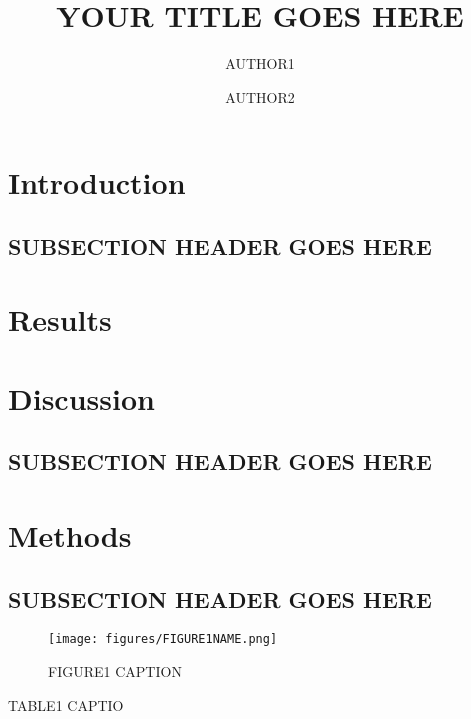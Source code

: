 \documentclass[fleqn,10pt]{wlscirep}
\title{YOUR TITLE GOES HERE}
\author[1,*]{AUTHOR1}
\author[1,*]{AUTHOR2}
\affil[*]{EMAIL}
\begin{document}
\maketitle

\section*{Introduction}
\subsection{SUBSECTION HEADER GOES HERE}

\section*{Results}


\section*{Discussion}
\subsection{SUBSECTION HEADER GOES HERE}

\section*{Methods}
\subsection{SUBSECTION HEADER GOES HERE}

\begin{figure}[ht]
\centering
\texttt{[image: figures/FIGURE1NAME.png]}
\caption{FIGURE1 CAPTION}
\label{fig:FIGURE1_LABEL}
\end{figure}

\begin{table}[ht]
    \centering
    
    \caption{TABLE1 CAPTIO}
    \label{tab:TABLE1_LABEL}
\end{table}
\end{document}
